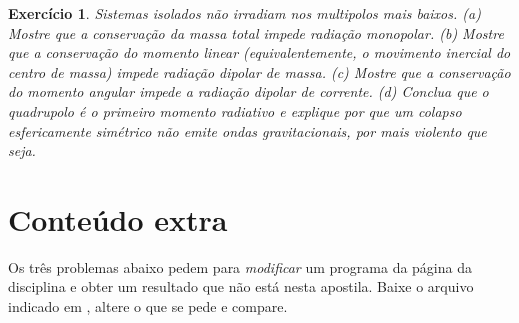 \documentclass[12pt,a4paper,oneside]{book}
\theoremstyle{rgplain}
\newtheorem{exercise}{Exercício}[chapter]
\theoremstyle{rgremark}
\begin{document}
\begin{exercise}
Sistemas isolados não irradiam nos multipolos mais baixos. (a) Mostre que a
conservação da massa total impede radiação monopolar. (b) Mostre que a
conservação do momento linear (equivalentemente, o movimento inercial do
centro de massa) impede radiação dipolar de massa. (c) Mostre que a
conservação do momento angular impede a radiação dipolar de corrente.
(d) Conclua que o quadrupolo é o primeiro momento radiativo e explique por que
um colapso esfericamente simétrico não emite ondas gravitacionais, por mais
violento que seja.
\end{exercise}


\section{Conteúdo extra}

Os três problemas abaixo pedem para \emph{modificar} um programa da página da disciplina e obter um resultado que não está nesta apostila. Baixe o arquivo indicado em \href{\rgsitecodigos}{\texttt{\rgsitecodigos}}, altere o que se pede e compare.
\end{document}
